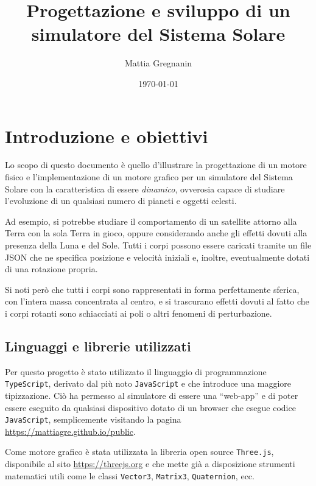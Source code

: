 \documentclass[11pt]{article}
\title{Progettazione e sviluppo di un\\simulatore del Sistema Solare}
\author{Mattia Gregnanin}
\date{\today}
\begin{document}
    \maketitle

    \tableofcontents

    \section{Introduzione e obiettivi}

    Lo scopo di questo documento è quello d'illustrare la progettazione di un motore fisico e l'implementazione di un motore grafico per un simulatore del Sistema Solare con la caratteristica di essere \emph{dinamico}, ovverosia capace di studiare l'evoluzione di un qualsiasi numero di pianeti e oggetti celesti. 
	
	Ad esempio, si potrebbe studiare il comportamento di un satellite attorno alla Terra con la sola Terra in gioco, oppure considerando anche gli effetti dovuti alla presenza della Luna e del Sole. Tutti i corpi possono essere caricati tramite un file JSON che ne specifica posizione e velocità iniziali e, inoltre, eventualmente dotati di una rotazione propria.

	Si noti però che tutti i corpi sono rappresentati in forma perfettamente sferica, con l'intera massa concentrata al centro, e si trascurano effetti dovuti al fatto che i corpi rotanti sono schiacciati ai poli o altri fenomeni di perturbazione.

	\subsection{Linguaggi e librerie utilizzati}

    Per questo progetto è stato utilizzato il linguaggio di programmazione \texttt{TypeScript}, derivato dal più noto \texttt{JavaScript} e che introduce una maggiore tipizzazione\cite{TypeScript}. Ciò ha permesso al simulatore di essere una ``\foreignlanguage{english}{web-app}'' e di poter essere eseguito da qualsiasi dispositivo dotato di un browser che esegue codice \texttt{JavaScript}, semplicemente visitando la pagina \url{https://mattiagre.github.io/public}. 

    Come motore grafico è stata utilizzata la libreria \foreignlanguage{english}{open source} \texttt{Three.js}, disponibile al sito \url{https://threejs.org} e che mette già a disposizione strumenti matematici utili come le classi \texttt{Vector3}, \texttt{Matrix3}, \texttt{Quaternion}, ecc\textellipsis. 
\end{document}
